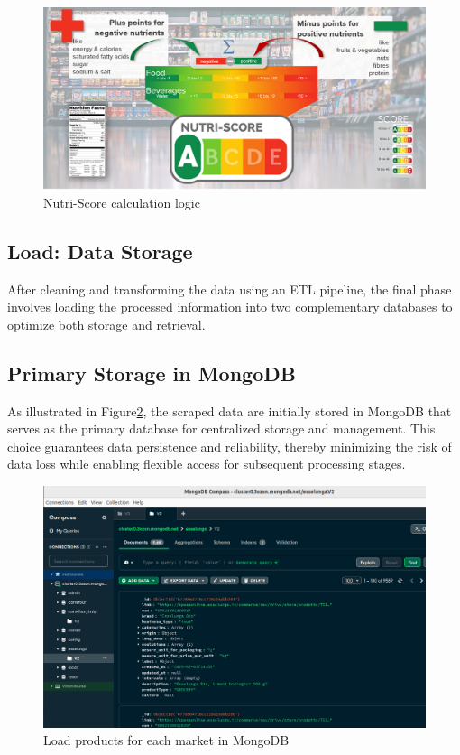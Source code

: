 \begin{center}
\begin{figure}[H]
    \includegraphics[scale=0.98]{images/nutriscore.jpg}
    \caption{Nutri-Score calculation logic} 
    \label{fig:add_nutriscore}
\end{figure}
\end{center}

\subsection{Load: Data Storage}
After cleaning and transforming the data using an ETL pipeline, the final
phase involves loading the processed information into two complementary
databases to optimize both storage and retrieval.

\subsection{Primary Storage in MongoDB}
As illustrated in Figure\ref{fig:load_data_mongo}, the scraped data are initially stored in MongoDB that serves as the primary database for centralized storage and management. 
This choice guarantees data persistence and reliability, thereby minimizing the risk of data loss while enabling flexible access for subsequent processing stages.


\begin{center}
\begin{figure}[H]
    \includegraphics[scale=0.45]{images/load_data.png}
    \caption{Load products for each market in MongoDB} 
    \label{fig:load_data_mongo}
\end{figure}
\end{center}

